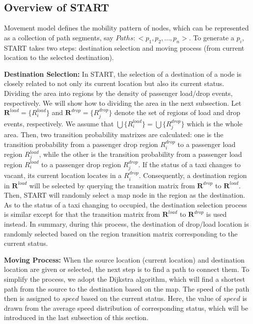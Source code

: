 
\subsection{Overview of START}

Movement model defines the mobility pattern of nodes, which can be represented as a collection of path segments, say $Paths:<p_1,p_2,...,p_n>$.  To generate a $p_i$, START takes two steps: destination selection and moving process (from current location to the selected destination).

\textbf{Destination Selection:} In START, the selection of a destination of a node is closely related to not only its current location but also its current status. Dividing the area into regions by the density of passenger load/drop events, respectively. We will show how to dividing the area in the next subsection. Let $\textbf{R}^{load}=\{R_i^{load}\}$ and $\textbf{R}^{drop}=\{R_j^{drop}\}$ denote the set of regions of load and drop events, respectively. We assume that $\bigcup\{R_i^{load}\}=\bigcup\{R_j^{drop}\}$ which is the whole area.  
Then, two transition probability matrixes are calculated: one is the transition probability from a passenger drop region $R_i^{drop}$ to a passenger load region $R_j^{load}$, while the other is the transition probability from a passenger load region $R_i^{load}$ to a passenger drop region $R_j^{drop}$.
If the status of a taxi changes to vacant, its current location locates in a $R_i^{drop}$. Consequently, a destination region in $\textbf{R}^{load}$ will be selected by querying the transition matrix from $\textbf{R}^{drop}$ to $\textbf{R}^{load}$. Then, START will randomly select a map node in the region as the destination. As to the status of a taxi changing to occupied, the destination selection process is similar except for that the transition matrix from $\textbf{R}^{load}$ to $\textbf{R}^{drop}$ is used instead. In summary, during this process, the destination of drop/load location is randomly selected based on the region transition matrix corresponding to the current status.

\textbf{Moving Process:} When the source location (current location) and destination location are given or selected, the next step is to find a path to connect them. To simplify the process, we adopt the Dijkstra algorithm, which will find a shortest path from the source to the destination based on the map. The speed of the path then is assigned to $speed$ based on the current status. Here, the value of $speed$ is drawn from the average speed distribution of corresponding status, which will be introduced in the last subsection of this section.


